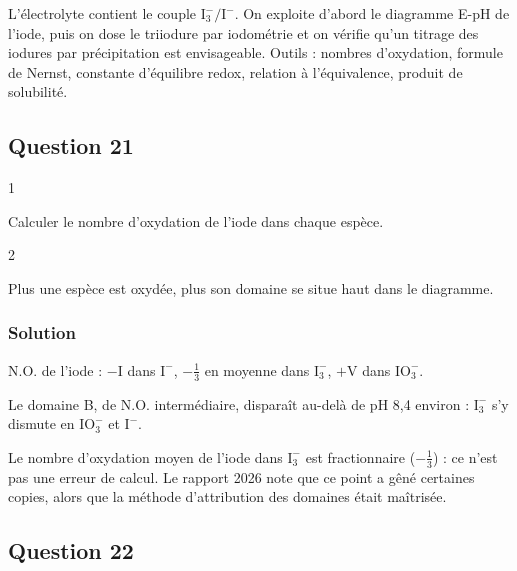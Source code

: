 \documentclass[11pt,a4paper]{article}
\newcommand{\equationajustee}[1]{%
  \sbox{\boiteequation}{$\displaystyle #1$}%
  \ifdim\wd\boiteequation>\linewidth
    \[\resizebox{\linewidth}{!}{\usebox{\boiteequation}}\]%
  \else
    \[#1\]%
  \fi}
\begin{document}
L'électrolyte contient le couple \(\mathrm{I_3^-/I^-}\). On exploite d'abord le diagramme E-pH de l'iode, puis on dose le triiodure par iodométrie et on vérifie qu'un titrage des iodures par précipitation est envisageable. Outils : nombres d'oxydation, formule de Nernst, constante d'équilibre redox, relation à l'équivalence, produit de solubilité.

\hypertarget{question-21}{%
\subsection{Question 21}\label{question-21}}

\begin{indication}{1}

Calculer le nombre d'oxydation de l'iode dans chaque espèce.

\end{indication}

\begin{indication}{2}

Plus une espèce est oxydée, plus son domaine se situe haut dans le diagramme.

\end{indication}

\hypertarget{solution-20}{%
\subsubsection{Solution}\label{solution-20}}

N.O. de l'iode : \(-\mathrm I\) dans \(\mathrm{I^-}\), \(-\tfrac13\) en moyenne dans \(\mathrm{I_3^-}\), \(+\mathrm V\) dans \(\mathrm{IO_3^-}\).

\equationajustee{\boxed{\mathrm A : \mathrm{IO_3^-},\qquad \mathrm B : \mathrm{I_3^-},\qquad \mathrm C : \mathrm{I^-}}}

Le domaine B, de N.O. intermédiaire, disparaît au-delà de pH 8,4 environ : \(\mathrm{I_3^-}\) s'y dismute en \(\mathrm{IO_3^-}\) et \(\mathrm{I^-}\).

\begin{piege}

Le nombre d'oxydation moyen de l'iode dans \(\mathrm{I_3^-}\) est fractionnaire (\(-\tfrac13\)) : ce n'est pas une erreur de calcul. Le rapport 2026 note que ce point a gêné certaines copies, alors que la méthode d'attribution des domaines était maîtrisée.

\end{piege}

\hypertarget{question-22}{%
\subsection{Question 22}\label{question-22}}
\end{document}
